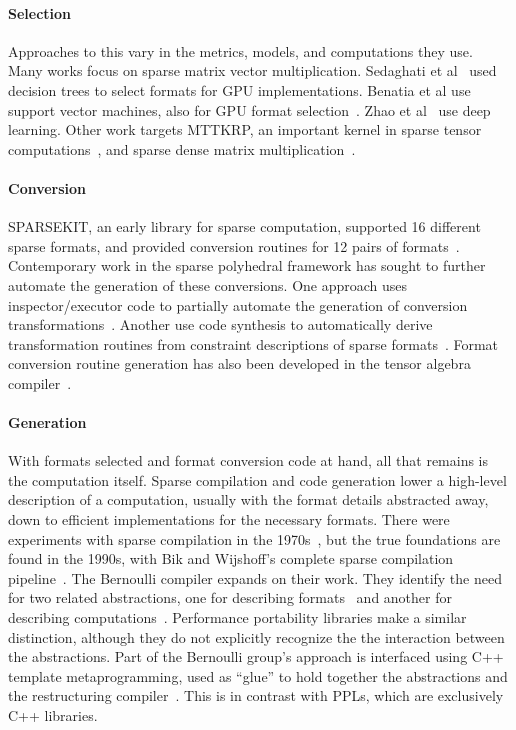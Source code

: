 \paragraph{Selection}
Approaches to this vary in the metrics, models, and computations they use.
Many works focus on sparse matrix vector multiplication.
Sedaghati et al~\cite{sedaghati2015automatic} used decision trees to select formats for GPU implementations.
Benatia et al use support vector machines, also for GPU format selection~\cite{benatia2016sparse}.
Zhao et al~\cite{zhao2018bridging} use deep learning.
Other work targets MTTKRP, an important kernel in sparse tensor computations~\cite{sun2021input}, and sparse dense matrix multiplication~\cite{chen2018performance}.

\paragraph{Conversion}
SPARSEKIT, an early library for sparse computation, supported 16 different sparse formats, and provided conversion routines for 12 pairs of formats~\cite{saad1990sparskit}.
Contemporary work in the sparse polyhedral framework has sought to further automate the generation of these conversions.
One approach uses inspector/executor code to partially automate the generation of conversion transformations~\cite{nandy2018abstractions}.
Another use code synthesis to automatically derive transformation routines from constraint descriptions of sparse formats~\cite{popoola2023code}.
Format conversion routine generation has also been developed in the tensor algebra compiler~\cite{chou2020automatic}.

\paragraph{Generation}
With formats selected and format conversion code at hand, all that remains is the computation itself.
Sparse compilation and code generation lower a high-level description of a computation, usually with the format details abstracted away, down to efficient implementations for the necessary formats.
There were experiments with sparse compilation in the 1970s~\cite{calahan1971description,mchugh1974simpl}, but the true foundations are found in the 1990s, with Bik and Wijshoff's complete sparse compilation pipeline~\cite{bik1993compilation, bik1993automatic,bik1996automatic}.
The Bernoulli compiler expands on their work.
They identify the need for two related abstractions, one for describing formats~\cite{kotlyar1997compiling} and another for describing computations~\cite{kotlyar1997relational}.
Performance portability libraries make a similar distinction, although they do not explicitly recognize the the interaction between the abstractions.
Part of the Bernoulli group's approach is interfaced using C++ template metaprogramming, used as \enquote{glue} to hold together the abstractions and the restructuring compiler~\cite{mateev2000bernoulli}.
This is in contrast with PPLs, which are exclusively C++ libraries.

